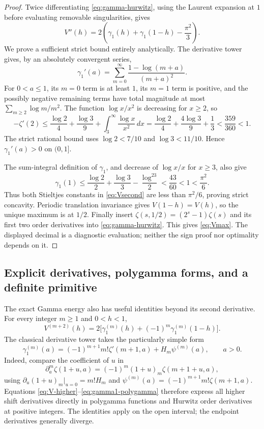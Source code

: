 \documentclass[11pt,a4paper]{article}
\numberwithin{equation}{section}
\theoremstyle{definition}
\theoremstyle{remark}
\begin{document}
\begin{proof}
Twice differentiating \eqref{eq:gamma-hurwitz}, using the Laurent
expansion at $1$ before evaluating removable singularities, gives
\begin{equation}\label{eq:Vsecond}
 V''(h)=2\left(\gamma_1(h)+\gamma_1(1-h)-\frac{\pi^2}{3}\right).
\end{equation}
We prove a sufficient strict bound entirely analytically. The derivative
tower gives, by an absolutely convergent series,
\[
 \gamma_1'(a)=\sum_{m=0}^{\infty}
                 \frac{1-\log(m+a)}{(m+a)^2}.
\]
For $0<a\leq1$, its $m=0$ term is at least $1$, its $m=1$ term is
positive, and the possibly negative remaining terms have total magnitude
at most $\sum_{m\geq2}\log m/m^2$. The function $\log x/x^2$
is decreasing for $x\geq2$, so
\[
 -\zeta'(2)
 \leq\frac{\log2}{4}+\frac{\log3}{9}
         +\int_3^\infty\frac{\log x}{x^2}\,dx
 =\frac{\log2}{4}+\frac{4\log3}{9}+\frac13
 <\frac{359}{360}<1.
\]
The strict rational bound uses $\log2<7/10$ and $\log3<11/10$.
Hence $\gamma_1'(a)>0$ on $(0,1]$.

The sum-integral definition of $\gamma_1$, and decrease of
$\log x/x$ for $x\geq3$, also give
\[
 \gamma_1(1)
 \leq\frac{\log2}{2}+\frac{\log3}{3}
                         -\frac{\log^23}{2}
 <\frac{43}{60}<1<\frac{\pi^2}{6}.
\]
Thus both Stieltjes constants in \eqref{eq:Vsecond} are less than
$\pi^2/6$, proving strict concavity. Periodic translation invariance
gives $V(1-h)=V(h)$, so the unique maximum is at $1/2$.
Finally insert $\zeta(s,1/2)=(2^s-1)\zeta(s)$ and its first two
order derivatives into \eqref{eq:gamma-hurwitz}. This gives
\eqref{eq:Vmax}. The displayed decimal is a diagnostic evaluation;
neither the sign proof nor optimality depends on it.
\end{proof}

\subsection{Explicit derivatives, polygamma forms, and a definite primitive}

The exact Gamma energy also has useful identities beyond its second
derivative. For every integer $m\geq1$ and $0<h<1$,
\begin{equation}\label{eq:V-higher}
 V^{(m+2)}(h)=2\bigl[\gamma_1^{(m)}(h)
                         +(-1)^m\gamma_1^{(m)}(1-h)\bigr].
\end{equation}
The classical derivative tower takes the particularly simple form
\begin{equation}\label{eq:gamma1-polygamma}
 \gamma_1^{(m)}(a)=(-1)^{m+1}m!\zeta'(m+1,a)
                         +H_m\psi^{(m)}(a),\qquad a>0.
\end{equation}
Indeed, compare the coefficient of $u$ in
\[
 \partial_a^m\zeta(1+u,a)
 =(-1)^m(1+u)_m\zeta(m+1+u,a),
\]
using $\partial_u(1+u)_m|_{u=0}=m!H_m$ and
$\psi^{(m)}(a)=(-1)^{m+1}m!\zeta(m+1,a)$.
Equations \eqref{eq:V-higher}--\eqref{eq:gamma1-polygamma}
therefore express all higher shift derivatives directly in polygamma
functions and Hurwitz order derivatives at positive integers. The
identities apply on the open interval; the endpoint derivatives
generally diverge.
\end{document}
